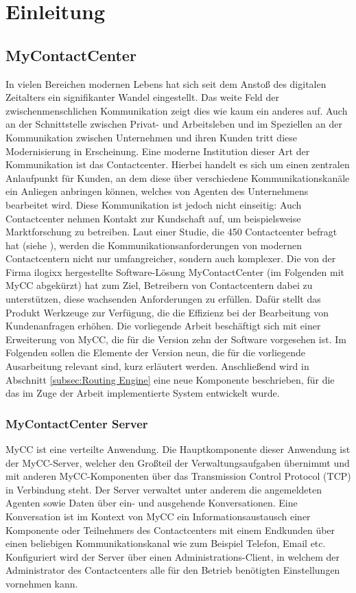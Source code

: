 \chapter{Einleitung}
\label{chap:Einleitung}

\section{MyContactCenter}
\label{sec:MyContactCenter}
In vielen Bereichen modernen Lebens hat sich seit dem Anstoß des digitalen Zeitalters ein signifikanter Wandel eingestellt. Das weite Feld  der zwischenmenschlichen Kommunikation zeigt dies wie kaum ein anderes auf. Auch an der Schnittstelle zwischen Privat- und Arbeitsleben und im Speziellen an der Kommunikation zwischen Unternehmen und ihren Kunden tritt diese Modernisierung in Erscheinung. Eine moderne Institution dieser Art der Kommunikation ist das Contactcenter. Hierbei handelt es sich um einen zentralen Anlaufpunkt für Kunden, an dem diese über verschiedene Kommunikationskanäle ein Anliegen anbringen können, welches von Agenten des Unternehmens bearbeitet wird. Diese Kommunikation ist jedoch nicht einseitig: Auch Contactcenter nehmen Kontakt zur Kundschaft auf, um beispielsweise Marktforschung zu betreiben. 
\newline
Laut einer Studie, die 450 Contactcenter befragt hat (siehe \cite{Deloitte:17}), werden die Kommunikationsanforderungen von modernen Contactcentern nicht nur umfangreicher, sondern auch komplexer. Die von der Firma ilogixx hergestellte Software-Lösung MyContactCenter (im Folgenden mit MyCC abgekürzt) hat zum Ziel, Betreibern von Contactcentern dabei zu unterstützen, diese wachsenden Anforderungen zu erfüllen. Dafür stellt das Produkt Werkzeuge zur Verfügung, die die Effizienz bei der Bearbeitung von Kundenanfragen erhöhen. Die vorliegende Arbeit beschäftigt sich mit einer Erweiterung von MyCC, die für die Version zehn der Software vorgesehen ist. Im Folgenden sollen die Elemente der Version neun, die für die vorliegende Ausarbeitung relevant sind, kurz erläutert werden. Anschließend wird in Abschnitt \ref{subsec:Routing Engine} eine neue Komponente beschrieben, für die das im Zuge der Arbeit implementierte System entwickelt wurde. 

\subsection{MyContactCenter Server}
\label{subsec:MyContactCenterServer}
MyCC ist eine verteilte Anwendung. Die Hauptkomponente dieser Anwendung ist der MyCC-Server, welcher den Großteil der Verwaltungsaufgaben übernimmt und mit anderen MyCC-Komponenten über das Transmission Control Protocol (TCP) in Verbindung steht. Der Server verwaltet unter anderem die angemeldeten Agenten sowie Daten über ein- und ausgehende Konversationen. Eine Konversation ist im Kontext von MyCC ein Informationsaustausch einer Komponente oder Teilnehmers des Contactcenters mit einem Endkunden über einen beliebigen Kommunikationskanal wie zum Beispiel Telefon, Email etc. Konfiguriert wird der Server über einen Administrations-Client, in welchem der Administrator des Contactcenters alle für den Betrieb benötigten Einstellungen vornehmen kann. 

